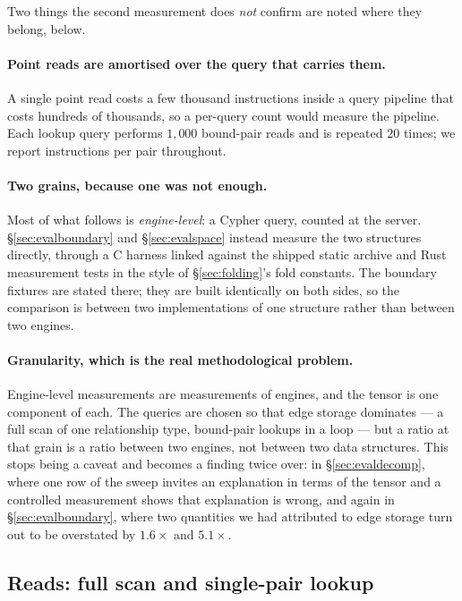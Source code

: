 \documentclass[11pt,a4paper]{article}
\theoremstyle{plain}
\theoremstyle{definition}
\theoremstyle{remark}
\begin{document}
Two things the second measurement does \emph{not} confirm are noted where they
belong, below.

\paragraph{Point reads are amortised over the query that carries them.} A
single point read costs a few thousand instructions inside a query pipeline
that costs hundreds of thousands, so a per-query count would measure the
pipeline. Each lookup query performs $1{,}000$ bound-pair reads and is repeated
$20$ times; we report instructions per pair throughout.

\paragraph{Two grains, because one was not enough.} Most of what follows is
\emph{engine-level}: a Cypher query, counted at the server. \S\ref{sec:evalboundary}
and \S\ref{sec:evalspace} instead measure the two structures directly, through a
C harness linked against the shipped static archive and Rust measurement tests in
the style of \S\ref{sec:folding}'s fold constants. The boundary fixtures are
stated there; they are built identically on both sides, so the comparison is
between two implementations of one structure rather than between two engines.

\paragraph{Granularity, which is the real methodological problem.} Engine-level
measurements are measurements of engines, and the tensor is one component of
each. The queries are chosen so that edge storage dominates --- a full scan
of one relationship type, bound-pair lookups in a loop --- but a ratio at that grain is
a ratio between two engines, not between two data structures. This stops being a
caveat and becomes a finding twice over: in \S\ref{sec:evaldecomp}, where one
row of the sweep invites an explanation in terms of the tensor and a controlled
measurement shows that explanation is wrong, and again in
\S\ref{sec:evalboundary}, where two quantities we had attributed to edge
storage turn out to be overstated by $1.6\times$ and $5.1\times$.

\subsection{Reads: full scan and single-pair lookup}
\label{sec:evalread}
\end{document}
